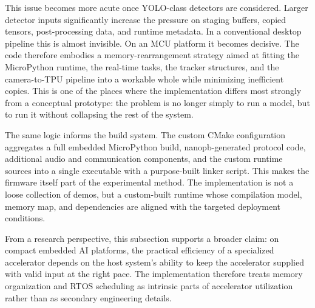 This issue becomes more acute once YOLO-class detectors are considered.
Larger detector inputs significantly increase the pressure on staging
buffers, copied tensors, post-processing data, and runtime metadata. In
a conventional desktop pipeline this is almost invisible. On an MCU
platform it becomes decisive. The code therefore embodies a
memory-rearrangement strategy aimed at fitting the MicroPython runtime,
the real-time tasks, the tracker structures, and the camera-to-TPU
pipeline into a workable whole while minimizing inefficient copies. This
is one of the places where the implementation differs most strongly from
a conceptual prototype: the problem is no longer simply to run a model,
but to run it without collapsing the rest of the system.

The same logic informs the build system. The custom CMake configuration
aggregates a full embedded MicroPython build, nanopb-generated protocol
code, additional audio and communication components, and the custom
runtime sources into a single executable with a purpose-built linker
script. This makes the firmware itself part of the experimental method.
The implementation is not a loose collection of demos, but a
custom-built runtime whose compilation model, memory map, and
dependencies are aligned with the targeted deployment conditions.

From a research perspective, this subsection supports a broader claim:
on compact embedded AI platforms, the practical efficiency of a
specialized accelerator depends on the host system's ability to keep the
accelerator supplied with valid input at the right pace. The
implementation therefore treats memory organization and RTOS scheduling
as intrinsic parts of accelerator utilization rather than as secondary
engineering details.
